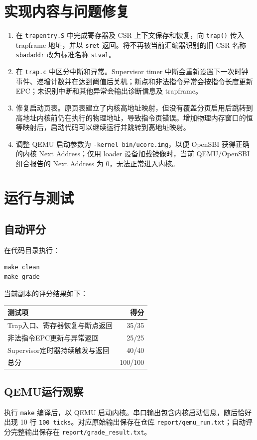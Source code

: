 \documentclass[UTF8,a4paper,12pt]{ctexart}
\begin{document}
\section{实现内容与问题修复}
\begin{enumerate}[leftmargin=2em]
  \item 在 \texttt{trapentry.S} 中完成寄存器及 CSR 上下文保存和恢复，向 \texttt{trap()} 传入 trapframe 地址，并以 \texttt{sret} 返回。将不再被当前汇编器识别的旧 CSR 名称 \texttt{sbadaddr} 改为标准名称 \texttt{stval}。
  \item 在 \texttt{trap.c} 中区分中断和异常。Supervisor timer 中断会重新设置下一次时钟事件、递增计数并在达到阈值后关机；断点和非法指令异常会按指令长度更新 EPC；未识别中断和其他异常会输出诊断信息及 trapframe。
  \item 修复启动页表。原页表建立了内核高地址映射，但没有覆盖分页启用后跳转到高地址内核前仍在执行的物理地址，导致指令页错误。增加物理内存窗口的恒等映射后，启动代码可以继续运行并跳转到高地址映射。
  \item 调整 QEMU 启动参数为 \texttt{-kernel bin/ucore.img}，以便 OpenSBI 获得正确的内核 Next Address；仅用 loader 设备加载镜像时，当前 QEMU/OpenSBI 组合报告的 Next Address 为 0，无法正常进入内核。
\end{enumerate}

\section{运行与测试}
\subsection{自动评分}
在代码目录执行：
\begin{lstlisting}
make clean
make grade
\end{lstlisting}
当前副本的评分结果如下：
\begin{center}
\begin{tabular}{lr}
\toprule
测试项 & 得分\\
\midrule
Trap入口、寄存器恢复与断点返回 & 35/35\\
非法指令EPC更新与异常返回 & 25/25\\
Supervisor定时器持续触发与返回 & 40/40\\
\midrule
总分 & 100/100\\
\bottomrule
\end{tabular}
\end{center}

\subsection{QEMU运行观察}
执行 \texttt{make} 编译后，以 QEMU 启动内核。串口输出包含内核启动信息，随后恰好出现 10 行 \texttt{100 ticks}。对应原始输出保存在仓库 \texttt{report/qemu\_run.txt}；自动评分完整输出保存在 \texttt{report/grade\_result.txt}。
\end{document}
